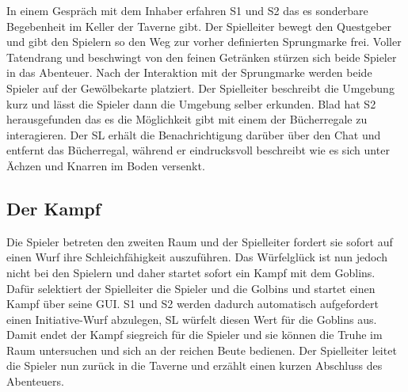 In einem Gespräch mit dem Inhaber erfahren S1 und S2 das es sonderbare Begebenheit im Keller der Taverne gibt. Der Spielleiter bewegt den Questgeber und gibt den Spielern so den Weg zur vorher definierten Sprungmarke frei.\newline
Voller Tatendrang und beschwingt von den feinen Getränken stürzen sich beide Spieler in das Abenteuer.
Nach der Interaktion mit der Sprungmarke werden beide Spieler auf der Gewölbekarte platziert. Der Spielleiter beschreibt die Umgebung kurz und lässt die Spieler dann die Umgebung selber erkunden. Blad hat S2 herausgefunden das es die Möglichkeit gibt mit einem der Bücherregale zu interagieren. Der SL erhält die Benachrichtigung darüber über den Chat und entfernt das Bücherregal, während er eindrucksvoll beschreibt wie es sich unter Ächzen und Knarren im Boden versenkt.\newline


\subsection{Der Kampf}
\label{sec:DerKampf}
Die Spieler betreten den zweiten Raum und der Spielleiter fordert sie sofort auf einen Wurf ihre Schleichfähigkeit auszuführen. Das Würfelglück ist nun jedoch nicht bei den Spielern und daher startet sofort ein Kampf mit dem Goblins.\newline
Dafür selektiert der Spielleiter die Spieler und die Golbins und startet einen Kampf über seine GUI. S1 und S2 werden dadurch automatisch aufgefordert einen Initiative-Wurf abzulegen, SL würfelt diesen Wert für die Goblins aus. 
Damit endet der Kampf siegreich für die Spieler und sie können die Truhe im Raum untersuchen und sich an der reichen Beute bedienen. Der Spielleiter leitet die Spieler nun zurück in die Taverne und erzählt einen kurzen Abschluss des Abenteuers.


